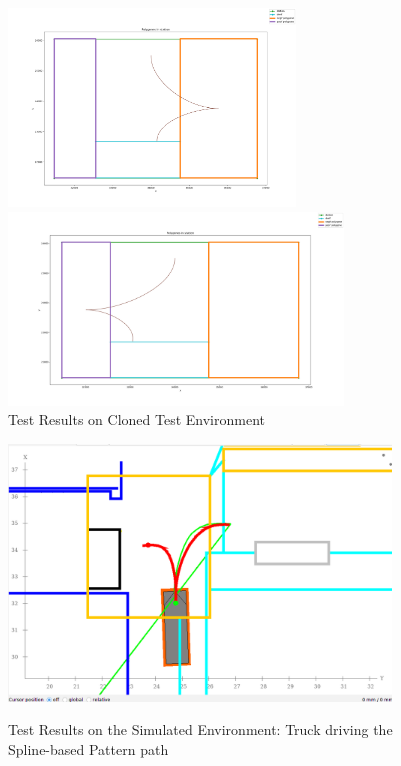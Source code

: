 \begin{figure}[H]
    \centering
    \begin{minipage}{0.45\textwidth}
        \centering
        \includegraphics[width=3in]{images/Chap2/spline_split.png} 
    \end{minipage}
    \begin{minipage}{0.45\textwidth}
        \centering
        \includegraphics[width=3.5in]{images/Chap2/spline_split_posY.png}
    \end{minipage}
    \caption{Test Results on Cloned Test Environment}
    \label{Test_clone}
\end{figure}

\begin{figure}[H]
    \begin{center}
        \includegraphics[width=4in]{images/Chap2/Pattern_spline_simulation_3_driving.png}\\
        \caption{Test Results on the Simulated Environment: Truck driving the Spline-based Pattern path}
        \label{driving}
        \end{center}    
\end{figure}


